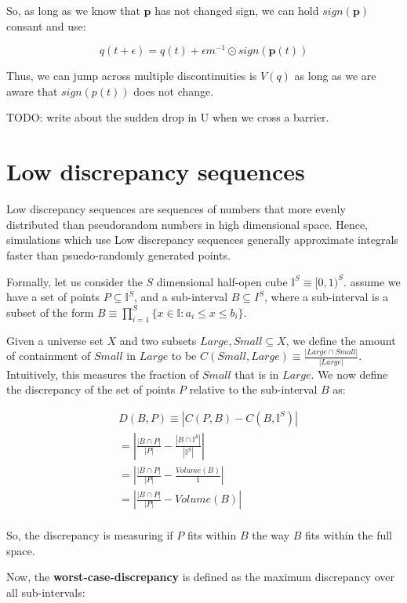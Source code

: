 \documentclass[titlepage]{article}
\newcommand{\I}{\mathbb{I}}
\newcommand{\p}{\mathbf{p}}
\begin{document}
So, as long as we know that $\p$ has not changed sign, we can hold $sign(\p)$
consant and use:

$$
q(t + \epsilon) = q(t) + \epsilon m^{-1} \odot sign(\p(t))
$$

Thus, we can jump across multiple discontinuities is $V(q)$ as long as we are
aware that $sign(p(t))$ does not change.

TODO: write about the sudden drop in U when we cross a barrier.

\section{Low discrepancy sequences}
Low discrepancy sequences are sequences of numbers that more evenly
distributed than pseudorandom numbers in high dimensional space. Hence,
simulations which use Low discrepancy sequences generally approximate
integrals faster than psuedo-randomly generated points.

Formally, let us consider the $S$ dimensional half-open cube $\I^S \equiv [0, 1)^S$.
assume we have a set of points $P \subseteq \I^S$, and a sub-interval
$B \subseteq I^S$, where a sub-interval is a subset of the form 
$B \equiv \prod_{i=1}^S \{ x \in \I : a_i \leq x \leq b_i \}$.

Given a universe set $X$ and two subsets $Large, Small \subseteq X$, we define
the amount of containment of $Small$ in $Large$ to be $C(Small, Large) \equiv
\frac{|Large \cap Small|}{|Large|}$. Intuitively, this measures the fraction
of $Small$ that is in $Large$. We now define the discrepancy of the set
of points $P$ relative to the sub-interval $B$ as:

\begin{align*}
&D(B, P) \equiv \left| C(P, B) - C(B, \I^S) \right| \\
&= \left| \frac{|B \cap P|}{|P|} - \frac{|B \cap \I^S|}{|\I^S|} \right|  \\
&= \left| \frac{|B \cap P|}{|P|} - \frac{Volume(B)}{1} \right| \\
&= \left| \frac{|B \cap P|}{|P|} - Volume(B) \right| \\
\end{align*}

So, the discrepancy is measuring if $P$ fits within $B$ the way $B$ fits within
the full space.

Now, the \textbf{worst-case-discrepancy} is defined as the maximum discrepancy
over all sub-intervals:
\end{document}
